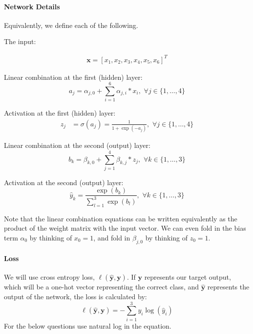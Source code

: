 \documentclass[11pt]{article}
\numberwithin{equation}{section} %
\numberwithin{figure}{section} %
\numberwithin{table}{section} %
\newcommand{\xv}{\mathbf{x}}
\newcommand{\yv}{\mathbf{y}}
\begin{document}
\paragraph{Network Details}

Equivalently, we define each of the following. 

The input:

\begin{align}
\xv=[x_1,x_2,x_3,x_4,x_5,x_6]^T
\end{align}

Linear combination at the first (hidden) layer:
\begin{equation}
a_j= \alpha_{j,0} + \sum_{i=1}^6 \alpha_{j,i}*x_i,\,\, \forall j \in \{1,\ldots,4\}
\end{equation}

Activation at the first (hidden) layer:
\begin{align}
z_j &= \sigma(a_j) = \frac{1}{1+\exp(-a_j)},\,\, \forall j \in \{1,\ldots,4\}
\end{align}

Linear combination at the second (output) layer:
\begin{equation}
b_k = \beta_{k,0} + \sum_{j=1}^4 \beta_{k,j}*z_j,\,\, \forall k \in \{1,\ldots,3\}
\end{equation}

Activation at the second (output) layer:
\begin{equation}
\hat{y}_k = \frac{\exp(b_k)}{\sum\limits_{l=1}^3 \exp(b_l)},\,\, \forall k \in \{1,\ldots,3\}
\end{equation}

Note that the linear combination equations can be written equivalently as the product of the weight matrix with the input vector. We can even fold in the bias term $\alpha_0$ by thinking of $x_0 = 1$, and fold in $\beta_{j,0}$ by thinking of $z_0 = 1$.

\paragraph{Loss}

We will use cross entropy loss, $\ell(\hat{\yv},\yv)$. If $\yv$ represents our target output, which will be a one-hot vector representing the correct class, and $\hat{\yv}$ represents the output of the network, the loss is calculated by:
\begin{equation}
   \ell(\hat{\yv},\yv) = - \sum_{i=1}^3 y_i \log(\hat{y}_i)
\end{equation}
For the below questions use natural log in the equation.
\end{document}
